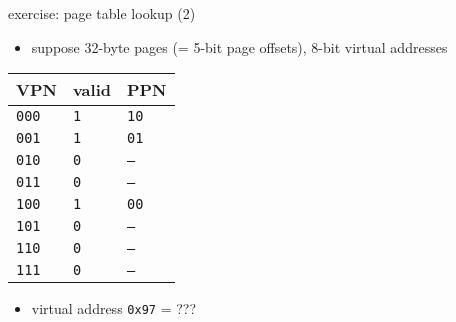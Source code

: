 \begin{frame}{exercise: page table lookup (2)}
    \begin{itemize}
    \item suppose 32-byte pages (= 5-bit page offsets), 8-bit virtual addresses
    \end{itemize}
\begin{tabular}{l|l|l}
VPN & valid & PPN \\ \hline
\tt 000 & \tt 1 & \tt 10 \\ \hline
\tt 001 & \tt 1 & \tt 01 \\ \hline
\tt 010 & \tt 0 & \tt --- \\ \hline
\tt 011 & \tt 0 & \tt --- \\ \hline
\tt 100 & \tt 1 & \tt 00 \\ \hline
\tt 101 & \tt 0 & \tt --- \\ \hline
\tt 110 & \tt 0 & \tt --- \\ \hline
\tt 111 & \tt 0 & \tt --- \\ \hline
\end{tabular}
    \begin{itemize}
    \item virtual address {\tt 0x97} = ???
    \end{itemize}
\end{frame}
